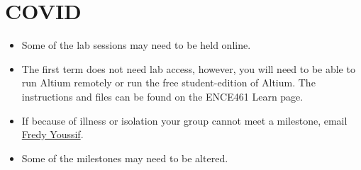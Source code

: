 \documentclass[11pt, a4paper]{article}
\makeatletter
\newcommand{\fredy}{\href{mailto:fredy.youssif@pg.canterbury.ac.nz}{Fredy Youssif}}
\makeatother
\begin{document}
\section{COVID}


\begin{itemize}
\item Some of the lab sessions may need to be held online.

\item The first term does not need lab access, however, you will need
  to be able to run Altium remotely or run the free student-edition of
  Altium.  The instructions and files can be found on the ENCE461
  Learn page.

\item If because of illness or isolation your group cannot meet a
  milestone, email \fredy.

\item Some of the milestones may need to be altered.

\end{itemize}
\end{document}
